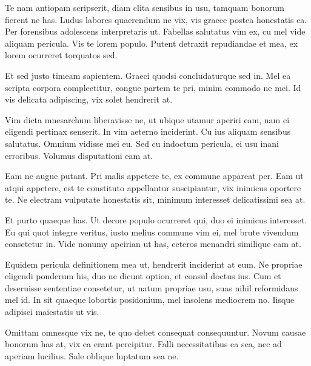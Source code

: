 \documentclass[12pt, a4paper]{article}
\theoremstyle{definition}
\theoremstyle{remark}
\numberwithin{equation}{section}
\numberwithin{figure}{section}
\numberwithin{table}{section}
\begin{document}
        Te nam antiopam scripserit, diam clita sensibus in usu, tamquam bonorum fierent ne has. Ludus labores quaerendum ne vix, vis graece postea honestatis ea. Per forensibus adolescens interpretaris ut. Fabellas salutatus vim ex, cu mel vide aliquam pericula. Vis te lorem populo. Putent detraxit repudiandae et mea, ex lorem ocurreret torquatos sed.

        Et sed justo timeam sapientem. Graeci quodsi concludaturque sed in. Mel ea scripta corpora complectitur, congue partem te pri, minim commodo ne mei. Id vis delicata adipiscing, vix solet hendrerit at.

        Vim dicta mnesarchum liberavisse ne, ut ubique utamur aperiri eam, nam ei eligendi pertinax senserit. In vim aeterno inciderint. Cu ius aliquam sensibus salutatus. Omnium vidisse mei eu. Sed cu indoctum pericula, ei usu inani erroribus. Volumus disputationi eam at.

        Eam ne augue putant. Pri malis appetere te, ex commune appareat per. Eam ut atqui appetere, est te constituto appellantur suscipiantur, vix inimicus oportere te. Ne electram vulputate honestatis sit, minimum interesset delicatissimi sea at.

        Et purto quaeque has. Ut decore populo ocurreret qui, duo ei inimicus interesset. Eu qui quot integre veritus, iusto melius commune vim ei, mel brute vivendum consetetur in. Vide nonumy apeirian ut has, ceteros menandri similique eam at.

        Equidem pericula definitionem mea ut, hendrerit inciderint at eum. Ne propriae eligendi ponderum his, duo ne dicunt option, et consul doctus ius. Cum et deseruisse sententiae consetetur, ut natum propriae usu, suas nihil reformidans mel id. In sit quaeque lobortis posidonium, mel insolens mediocrem no. Iisque adipisci maiestatis ut vis.

        Omittam omnesque vix ne, te quo debet consequat consequuntur. Novum causae bonorum has at, vix ea erant percipitur. Falli necessitatibus ea sea, nec ad aperiam lucilius. Sale oblique luptatum sea ne.
\end{document}
